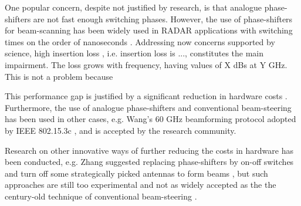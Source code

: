 One popular concern, despite not justified by research, is that analogue phase-shifters are not fast enough switching phases. However, the use of phase-shifters for beam-scanning has been widely used in \ac{RADAR} applications with switching times on the order of nanoseconds \cite{volakis}. Addressing now concerns supported by science, high insertion loss \cite{beam_steering_techniques}, i.e. insertion loss is ..., constitutes the main impairment. The loss grows with frequency, having values of X dBs at Y GHz. This is not a problem because %



This performance gap is justified by a significant reduction in hardware costs \cite{7010533}. Furthermore, the use of analogue phase-shifters and conventional beam-steering has been used in other cases, e.g. Wang's 60 GHz beamforming protocol adopted by IEEE 802.15.3c \cite{5262295}, and is accepted by the research community.

Research on other innovative ways of further reducing the costs in hardware has been conducted, e.g. Zhang suggested replacing phase-shifters by on-off switches and turn off some strategically picked antennas to form beams \cite{8246591}, but such approaches are still too experimental and not as widely accepted as the the century-old technique of conventional beam-steering \cite{6591907}.












